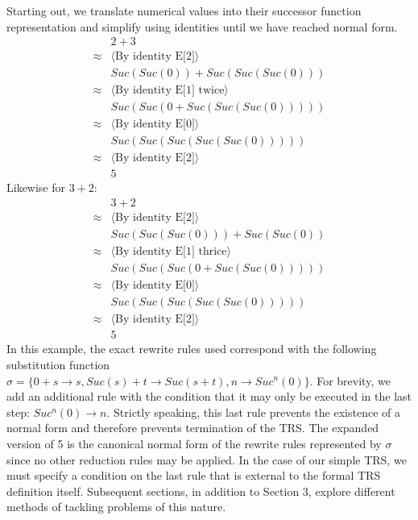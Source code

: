 \documentclass{article}
\begin{document}
Starting out, we translate numerical values into their successor function representation and simplify using identities until we have reached normal form.
\begin{align*}
    &2 + 3\\
    \approx& \langle \text{By identity E[2]} \rangle\\
    &Suc(Suc(0)) + Suc(Suc(Suc(0)))\\
    \approx& \langle \text{By identity E[1] twice} \rangle\\
    &Suc(Suc(0 + Suc(Suc(Suc(0)))))\\
    \approx& \langle \text{By identity E[0]} \rangle\\
    &Suc(Suc(Suc(Suc(Suc(0)))))\\
    \approx& \langle \text{By identity E[2]} \rangle\\
    &5
\end{align*}
Likewise for $3+2$:
\begin{align*}
    &3 + 2\\
    \approx& \langle \text{By identity E[2]} \rangle\\
    &Suc(Suc(Suc(0))) + Suc(Suc(0))\\
    \approx& \langle \text{By identity E[1] thrice} \rangle\\
    &Suc(Suc(Suc(0 + Suc(Suc(0)))))\\
    \approx& \langle \text{By identity E[0]} \rangle\\
    &Suc(Suc(Suc(Suc(Suc(0)))))\\
    \approx& \langle \text{By identity E[2]} \rangle\\
    &5
\end{align*}
In this example, the exact rewrite rules used correspond with the following substitution function
$\sigma = \{0 + s \rightarrow s, Suc(s) + t \rightarrow Suc(s + t), n \rightarrow Suc^n(0)\}$.
For brevity, we add an additional rule with the condition that it may only be executed in the last step: $Suc^n(0) \rightarrow n$.
Strictly speaking, this last rule prevents the existence of a normal form and therefore prevents termination of the TRS.
The expanded version of 5 is the canonical normal form of the rewrite rules represented by $\sigma$ since no other reduction rules may be applied.
In the case of our simple TRS, we must specify a condition on the last rule that is external to the formal TRS definition itself.
Subsequent sections, in addition to Section 3, explore different methods of tackling problems of this nature.
\end{document}
